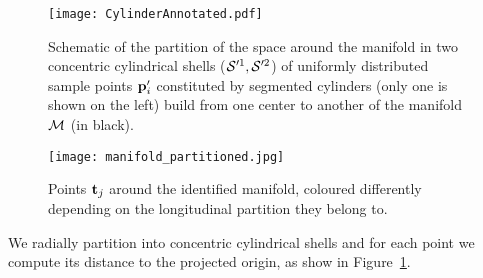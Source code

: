 \begin{figure}
  \centering
  \texttt{[image: CylinderAnnotated.pdf]}
  \caption{Schematic of the partition of the space around the manifold in two concentric cylindrical shells ($\mathcal{S}'^1, \mathcal{S}'^2$) of uniformly distributed sample points $\boldsymbol{\mathbf{p}}'_i$ constituted by segmented cylinders (only one is shown on the left) build from one center to another of the manifold $\mathcal{M}$ (in black).}
  \label{fig:cylinder}
\end{figure}

\begin{figure}
  \centering
  \texttt{[image: manifold\_partitioned.jpg]}
  \caption{Points $\boldsymbol{\mathbf{t}}_j$ around the identified manifold, coloured differently depending on the longitudinal partition they belong to.}
  \label{fig:segmented_manifold}
\end{figure}

We radially partition into concentric cylindrical shells and for each point we compute its distance to the projected origin, as show in Figure~\ref{fig:cylinder}.

